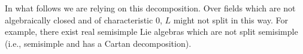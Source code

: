 In what follows we are relying on this decomposition. Over fields which are
not algebraically closed and of characteristic $0$, $L$ might not split in
this way. For example, there exist real semisimple Lie algebras which are not
split semisimple (i.e., semisimple and has a Cartan decomposition).
